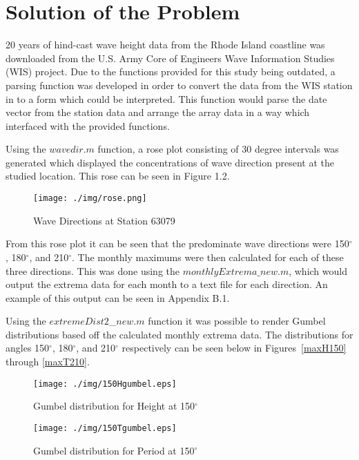 \section{Solution of the Problem}

20 years of hind-cast wave height data from the Rhode Island coastline was downloaded from the U.S. Army Core of Engineers Wave Information Studies (WIS) project. Due to the functions provided for this study being outdated, a parsing function was developed in order to convert the data from the WIS station in to a form which could be interpreted. This function would parse the date vector from the station data and arrange the array data in a way which interfaced with the provided functions.

Using the $wavedir.m$ function, a rose plot consisting of 30 degree intervals was generated which displayed the concentrations of wave direction present at the studied location. This rose can be seen in Figure 1.2.

\begin{figure}[H]
	\centering
	\texttt{[image: ./img/rose.png]}
	\label{wisdir}
	\caption{Wave Directions at Station 63079}
\end{figure}

From this rose plot it can be seen that the predominate wave directions were 150$^{\circ}$, 180$^{\circ}$, and 210$^{\circ}$. The monthly maximums were then calculated for each of these three directions. This was done using the $monthlyExtrema\_new.m$, which would output the extrema data for each month to a text file for each direction. An example of this output can be seen in Appendix B.1. 

Using the $extremeDist2$\_$new.m$ function it was possible to render Gumbel distributions based off the calculated monthly extrema data. The distributions for angles 150$^{\circ}$, 180$^{\circ}$, and 210$^{\circ}$ respectively can be seen below in Figures~\ref{maxH150} through \ref{maxT210}.

\begin{figure}[H]
\centering
\begin{minipage}{0.49\textwidth}
	\texttt{[image: ./img/150Hgumbel.eps]}
	\caption{Gumbel distribution for Height at 150$^\circ$}
	\label{maxH150}
\end{minipage}
\begin{minipage}{0.49\textwidth}
	\texttt{[image: ./img/150Tgumbel.eps]}
	\caption{Gumbel distribution for Period at 150$^\circ$}
	\label{maxT150}
\end{minipage}
\end{figure}

